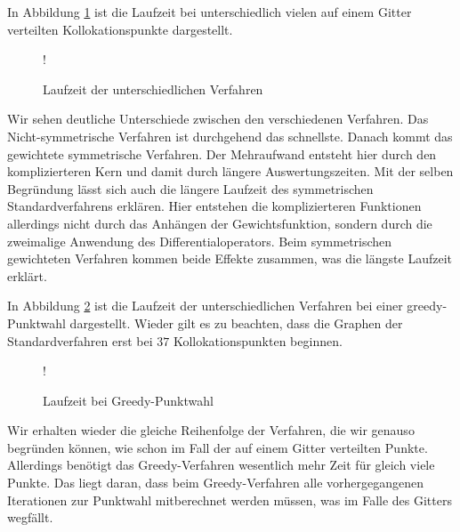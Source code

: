 In Abbildung \ref{fig:Laufzeit} ist die Laufzeit bei unterschiedlich vielen auf einem Gitter verteilten Kollokationspunkte dargestellt.
\begin{figure}[ht]
\centering
\resizebox {\columnwidth} {!} {

}
\caption{Laufzeit der unterschiedlichen Verfahren}
\label{fig:Laufzeit}
\end{figure}

Wir sehen deutliche Unterschiede zwischen den verschiedenen Verfahren. Das Nicht-symmetrische Verfahren ist durchgehend das schnellste. Danach kommt das gewichtete symmetrische Verfahren. Der Mehraufwand entsteht hier durch den komplizierteren Kern und damit durch längere Auswertungszeiten. Mit der selben Begründung lässt sich auch die längere Laufzeit des symmetrischen Standardverfahrens erklären. Hier entstehen die komplizierteren Funktionen allerdings nicht durch das Anhängen der Gewichtsfunktion, sondern durch die zweimalige Anwendung des Differentialoperators. Beim symmetrischen gewichteten Verfahren kommen beide Effekte zusammen, was die längste Laufzeit erklärt.

In Abbildung \ref{fig:Laufzeit-greedy} ist die Laufzeit der unterschiedlichen Verfahren bei einer greedy-Punktwahl dargestellt. Wieder gilt es zu beachten, dass die Graphen der Standardverfahren erst bei $37$ Kollokationspunkten beginnen.
\begin{figure}[ht]
\centering
\resizebox {\columnwidth} {!} {

}
\caption{Laufzeit bei Greedy-Punktwahl}
\label{fig:Laufzeit-greedy}
\end{figure}

Wir erhalten wieder die gleiche Reihenfolge der Verfahren, die wir genauso begründen können, wie schon im Fall der auf einem Gitter verteilten Punkte. Allerdings benötigt das Greedy-Verfahren wesentlich mehr Zeit für gleich viele Punkte. Das liegt daran, dass beim Greedy-Verfahren alle vorhergegangenen Iterationen zur Punktwahl mitberechnet werden müssen, was im Falle des Gitters wegfällt.